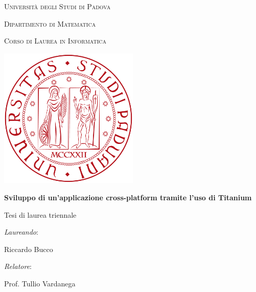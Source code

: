 \begin{titlepage}
	\thispagestyle{first_page_style}
	\centering
	\LARGE{\textsc{Università degli Studi di Padova}\par}
	\vspace{4mm}
	\large{\textsc{Dipartimento di Matematica}\par}
	\vspace{1mm}
	\large{\textsc{Corso di Laurea in Informatica}\par}
	\vspace{15mm}
	\includegraphics[width=0.5\textwidth]{copertina/immagini/logo_unipd.png}\par
	\vspace{20mm}
	\huge{\textbf{Sviluppo di un'applicazione cross-platform tramite l'uso di Titanium}\par}
	\vspace{10mm}
	\large{Tesi di laurea triennale\par}
	\vfill
	\begin{minipage}{\textwidth}
		\begin{minipage}{0.49\textwidth}
			\raggedright
			\large{\textit{Laureando}:\par}
			\large{Riccardo Bucco}
		\end{minipage}
		\begin{minipage}{0.49\textwidth}
			\raggedleft
			\large{\textit{Relatore}:\par}
			\large{Prof. Tullio Vardanega\par}
		\end{minipage}\par
	\end{minipage}
	\vspace{7mm}
	\restoregeometry
\end{titlepage}
